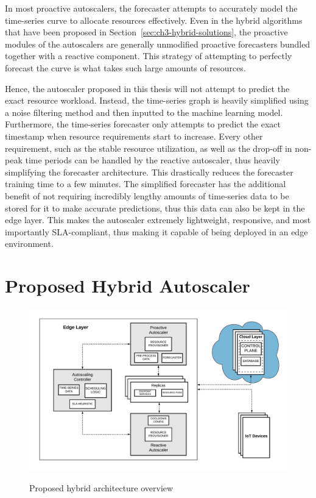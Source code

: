 In most proactive autoscalers, the forecaster attempts to accurately model the time-series curve to allocate resources effectively. Even in the hybrid algorithms that have been proposed in Section~\ref{sec:ch3-hybrid-solutions}, the proactive modules of the autoscalers are generally unmodified proactive forecasters bundled together with a reactive component. This strategy of attempting to perfectly forecast the curve is what takes such large amounts of resources.\par

Hence, the autoscaler proposed in this thesis will not attempt to predict the exact resource workload. Instead, the time-series graph is heavily simplified using a noise filtering method and then inputted to the machine learning model. Furthermore, the time-series forecaster only attempts to predict the exact timestamp when resource requirements start to increase. Every other requirement, such as the stable resource utilization, as well as the drop-off in non-peak time periods can be handled by the reactive autoscaler, thus heavily simplifying the forecaster architecture. This drastically reduces the forecaster training time to a few minutes. The simplified forecaster has the additional benefit of not requiring incredibly lengthy amounts of time-series data to be stored for it to make accurate predictions, thus this data can also be kept in the edge layer. This makes the autoscaler extremely lightweight, responsive, and most importantly SLA-compliant, thus making it capable of being deployed in an edge environment.\par

\section{Proposed Hybrid Autoscaler}
\label{sec:ch4-hybrid-autoscale-overview} 

\begin{figure}[htb]
    \centering
    \caption{Proposed hybrid architecture overview}
    \includegraphics[width=1.0\linewidth]{Figures/Hybrid-Architecture-Overview.pdf}
    \label{fig:hybrid-arch-overview}
\end{figure}

